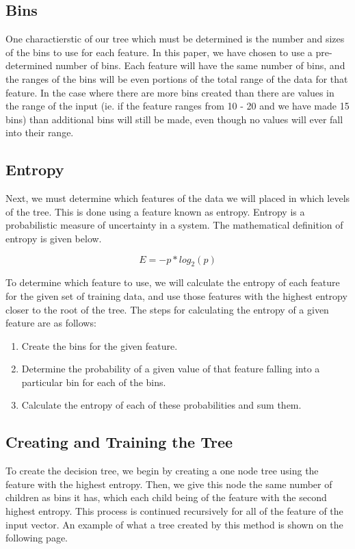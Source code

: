 \documentclass{article}
\begin{document}
	\subsection{Bins}
	One charactierstic of our tree which must be determined is the number and sizes of the bins to use for each feature. In this paper, we have chosen to use a pre-determined number of bins. Each feature will have the same number of bins, and the ranges of the bins will be even portions of the total range of the data for that feature. In the case where there are more bins created than there are values in the range of the input (ie. if the feature ranges from 10 - 20 and we have made 15 bins) than additional bins will still be made, even though no values will ever fall into their range.

	\subsection{Entropy}
	Next, we must determine which features of the data we will placed in which levels of the tree. This is done using a feature known as entropy. Entropy is a probabilistic measure of uncertainty in a system. The mathematical definition of entropy is given below.

	\begin{equation} E = -p * log_{2}(p) \end{equation}

	\indent To determine which feature to use, we will calculate the entropy of each feature for the given set of training data, and use those features with the highest entropy closer to the root of the tree. The steps for calculating the entropy of a given feature are as follows:

	\begin{enumerate}
		\item Create the bins for the given feature.
		\item Determine the probability of a given value of that feature falling into a particular bin for each of the bins.
		\item Calculate the entropy of each of these probabilities and sum them.
	\end{enumerate}

	\subsection{Creating and Training the Tree}
	To create the decision tree, we begin by creating a one node tree using the feature with the highest entropy. Then, we give this node the same number of children as bins it has, which each child being of the feature with the second highest entropy. This process is continued recursively for all of the feature of the input vector. An example of what a tree created by this method is shown on the following page.
\end{document}
